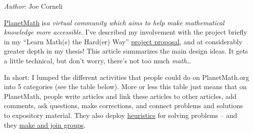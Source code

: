 \noindent \emph{Author}: Joe Corneli

\href{planetmath.org}{PlanetMath} is\emph{a virtual community which aims
to help make mathematical knowledge more accessible}. I've described my
involvement with the project briefly in my ``Learn Math(s) the Hard(er)
Way''
\href{http://campus.ftacademy.org/wiki/index.php/Seed\_Project:\_Learn\_Math\_the\_Hard\_Way}{project
proposal}, and at considerably greater depth in my thesis! This article
summarizes the main design ideas. It gets a little technical, but don't
worry, there's not too much \emph{math}\ldots{}

In short: I lumped the different activities that people could do on
PlanetMath.org into 5 categories (see the table below). More or less
this table just means that on PlanetMath, people write articles and link
these articles to other articles, add comments, ask questions, make
corrections, and connect problems and solutions to expository material.
They also deploy
\href{http://peeragogy.org/patterns-usecases/patterns-and-heuristics/}{heuristics}
for solving problems -- and they
\href{http://peeragogy.org/convening-group/}{make and join groups}.  

